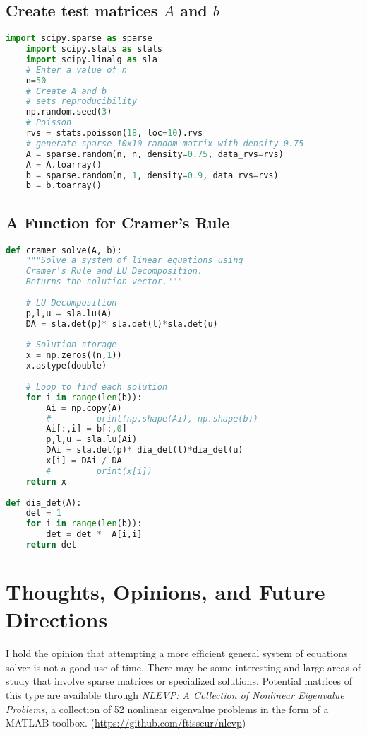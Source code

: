 \documentclass[12pt]{article}
\begin{document}
\subsection*{Create test matrices $A$ and $b$}
\begin{lstlisting}[language=Python]
	import scipy.sparse as sparse
	import scipy.stats as stats
	import scipy.linalg as sla
	# Enter a value of n
	n=50
	# Create A and b
	# sets reproducibility
	np.random.seed(3) 
	# Poisson
	rvs = stats.poisson(18, loc=10).rvs
	# generate sparse 10x10 random matrix with density 0.75
	A = sparse.random(n, n, density=0.75, data_rvs=rvs)
	A = A.toarray()
	b = sparse.random(n, 1, density=0.9, data_rvs=rvs)
	b = b.toarray()
\end{lstlisting}

\subsection*{A Function for Cramer's Rule}
\begin{lstlisting}[language=Python]
def cramer_solve(A, b):
	"""Solve a system of linear equations using 
	Cramer's Rule and LU Decomposition.
	Returns the solution vector."""
	
	# LU Decomposition
	p,l,u = sla.lu(A)
	DA = sla.det(p)* sla.det(l)*sla.det(u)
	
	# Solution storage
	x = np.zeros((n,1))
	x.astype(double)
	
	# Loop to find each solution
	for i in range(len(b)):
		Ai = np.copy(A)
		#         print(np.shape(Ai), np.shape(b))
		Ai[:,i] = b[:,0]
		p,l,u = sla.lu(Ai)
		DAi = sla.det(p)* dia_det(l)*dia_det(u)
		x[i] = DAi / DA
		#         print(x[i])
	return x
	
def dia_det(A):
	det = 1
	for i in range(len(b)):
		det = det *  A[i,i]
	return det
\end{lstlisting}


\section*{Thoughts, Opinions, and Future Directions}
I hold the opinion that attempting a more efficient general system of equations solver is not a good use of time. There may be some interesting and large areas of study that involve sparse matrices or specialized solutions. Potential matrices of this type are available through \textit{NLEVP: A Collection of Nonlinear Eigenvalue Problems}, a collection of 52 nonlinear eigenvalue problems in the form of a MATLAB toolbox. (\url{https://github.com/ftisseur/nlevp})
\end{document}
